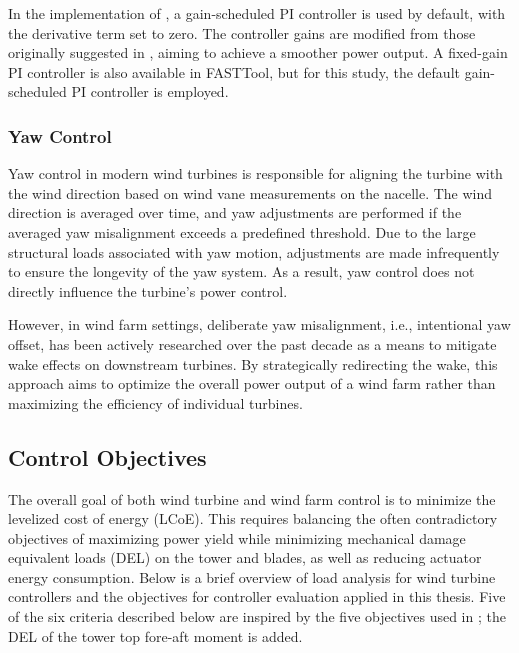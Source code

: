 In the implementation of \cite{mulders2020wind}, a gain-scheduled PI controller is used by default, with the derivative term set to zero. The controller gains are modified from those originally suggested in \cite{jonkman2009definition}, aiming to achieve a smoother power output. A fixed-gain PI controller is also available in FASTTool, but for this study, the default gain-scheduled PI controller is employed.

\subsubsection{Yaw Control}
Yaw control in modern wind turbines is responsible for aligning the turbine with the wind direction based on wind vane measurements on the nacelle. The wind direction is averaged over time, and yaw adjustments are performed if the averaged yaw misalignment exceeds a predefined threshold. Due to the large structural loads associated with yaw motion, adjustments are made infrequently to ensure the longevity of the yaw system. As a result, yaw control does not directly influence the turbine's power control.

However, in wind farm settings, deliberate yaw misalignment, i.e., intentional yaw offset, has been actively researched over the past decade as a means to mitigate wake effects on downstream turbines. By strategically redirecting the wake, this approach aims to optimize the overall power output of a wind farm rather than maximizing the efficiency of individual turbines.

\subsection{Control Objectives}\label{subsection Control Objectives}
The overall goal of both wind turbine and wind farm control is to minimize the levelized cost of energy (LCoE). This requires balancing the often contradictory objectives of maximizing power yield while minimizing mechanical damage equivalent loads (DEL) on the tower and blades, as well as reducing actuator energy consumption. Below is a brief overview of load analysis for wind turbine controllers and the objectives for controller evaluation applied in this thesis. Five of the six criteria described below are inspired by the five objectives used in \cite{hoffmann2018load}; the DEL of the tower top fore-aft moment is added. 



